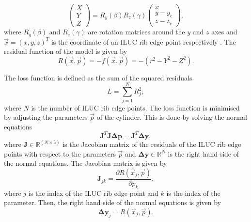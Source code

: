 \begin{equation}
    \begin{pmatrix}
        X \\
        Y \\
        Z
    \end{pmatrix} =
    R_y(\beta) R_z(\gamma) \begin{pmatrix}
        x       \\
        y - y_c \\
        z - z_c
    \end{pmatrix},
    \label{eq:cylinder_coordinates}
\end{equation}
where $R_y(\beta)$ and $R_z(\gamma)$ are rotation matrices around the $y$ and $z$ axes and $\vec{x} = (x, y, z)^T$ is the coordinate of an ILUC rib edge point respectively \cite[equation 5]{cylinder_fit}.
The residual function of the model is given by
\begin{equation}
    R(\vec{x},\vec{p}) = -f(\vec{x},\vec{p}) = -(r^2 - Y^2 - Z^2).
    \label{eq:cylinder_residual}
\end{equation}

The loss function is defined as the sum of the squared residuals
\begin{equation}
    L = \sum_{j=1}^{N} R_j^2,
    \label{eq:cylinder_loss}
\end{equation}
where $N$ is the number of ILUC rib edge points. The loss function is minimised by adjusting the parameters $\vec{p}$ of the cylinder. This is done by solving the normal equations
\begin{equation}
    \mathbf{J}^T \mathbf{J} \mathbf{\Delta p} = \mathbf{J}^T \mathbf{\Delta y},
    \label{eq:cylinder_normal_equations}
\end{equation}
where $\mathbf{J} \in \mathbb{R}^{(N\times5)}$ is the Jacobian matrix of the residuals of the ILUC rib edge points with respect to the parameters $\vec{p}$ and $\mathbf{\Delta y}\in\mathbb{R}^N$ is the right hand side of the normal equations. The Jacobian matrix is given by
\begin{equation}
    \mathbf{J}_{jk} = \frac{\partial R(\vec{x}_j, \vec{p})}{\partial p_k},
\end{equation}
where $j$ is the index of the ILUC rib edge point and $k$ is the index of the parameter. Then, the right hand side of the normal equations is given by
\begin{equation}
    \mathbf{\Delta y}_j = R(\vec{x}_j, \vec{p}).
    \label{eq:cylinder_rhs}
\end{equation}

